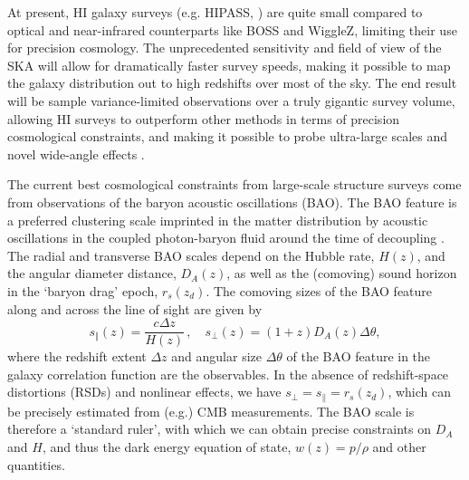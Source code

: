 \documentclass[useAMS,usenatbib]{mn2e}
\newcommand{\corr}{\color{blue}} %
\begin{document}
At present, HI galaxy surveys (e.g. HIPASS, \citealt{2004MNRAS.350.1195M}) are quite small compared to optical and near-infrared counterparts like BOSS and WiggleZ, limiting their use for precision cosmology. {\corr The unprecedented sensitivity and field of view} of the SKA will allow for dramatically faster survey speeds, making it possible to map the galaxy distribution out to high redshifts over most of the sky. The end result will be sample variance-limited observations over a truly gigantic survey volume, allowing HI surveys to outperform other methods in terms of precision cosmological constraints, and making it possible to probe ultra-large scales and novel wide-angle effects \citep{Abdalla:2009wr, 2014arXiv1409.8286C}.

The current best cosmological constraints from large-scale structure surveys come from observations of the baryon acoustic oscillations (BAO). The BAO feature is a preferred clustering scale imprinted in the matter distribution by acoustic oscillations in the coupled photon-baryon fluid around the time of decoupling \citep{Bassett:2009mm}. The radial and transverse BAO scales depend on the Hubble rate, $H(z)$, and the angular diameter distance, $D_A(z)$, as well as the (comoving) sound horizon in the `baryon drag' epoch, $r_s(z_d)$. The comoving sizes of the BAO feature along and across the line of sight are given by
\begin{equation}\label{DandH}
s_\Vert(z) = \frac{c \Delta z}{H(z)}\,,  \quad s_\perp(z) = (1+z) D_{A}(z) \Delta \theta,
\end{equation}
where the redshift extent $\Delta z$ and angular size $\Delta \theta$ of the BAO feature in the galaxy correlation function are the observables. In the absence of redshift-space distortions (RSDs) {\corr and  nonlinear effects}, we have $s_\perp = s_\parallel = r_s(z_d)$, which can be precisely estimated from (e.g.) CMB measurements. The BAO scale is therefore a `standard ruler', with which we can obtain precise constraints on $D_A$ and $H$, and thus the dark energy equation of state, $w(z)=p/\rho$ and other quantities.

\end{document}
